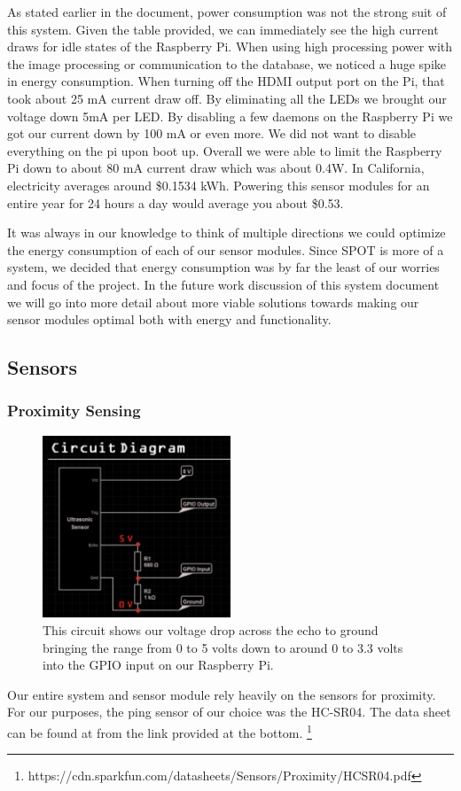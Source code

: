 As stated earlier in the document, power consumption was not the strong suit of this system. 
Given the table provided, we can immediately see the high current draws for idle states of the Raspberry Pi. 
When using high processing power with the image processing or communication to the database, we noticed a huge spike in energy consumption. 
When turning off the HDMI output port on the Pi, that took about 25 mA current draw off. 
By eliminating all the LEDs we brought our voltage down 5mA per LED. 
By disabling a few daemons on the Raspberry Pi  we got our current down by 100 mA or even more. 
We did not want to disable everything on the pi upon boot up. 
Overall we were able to limit the Raspberry Pi down to about 80 mA current draw which was about 0.4W.
In California, electricity averages around \$0.1534 kWh. 
Powering this sensor modules for an entire year for 24 hours a day would average you about \$0.53.

It was always in our knowledge to think of multiple directions we could optimize the energy consumption of each of our sensor modules.
Since SPOT is more of a system, we decided that energy consumption was by far the least of our worries and focus of the project.
In the future work discussion of this system document we will go into more detail about more viable solutions towards making our sensor modules optimal both with energy and functionality.
\subsection{Sensors}

\subsubsection{Proximity Sensing}
\begin{figure}[ht!]
\centering
\includegraphics[width=0.5\textwidth]{pictures/ping_circuit.png}
\caption{This circuit shows our voltage drop across the echo to ground bringing the range from 0 to 5 volts down to around 0 to 3.3 volts into the GPIO input on our Raspberry Pi.}
\end{figure}
Our entire system and sensor module rely heavily on the sensors for proximity.
For our purposes, the ping sensor of our choice was the HC-SR04.
The data sheet can be found at from the link provided at the bottom. \footnote{https://cdn.sparkfun.com/datasheets/Sensors/Proximity/HCSR04.pdf}

